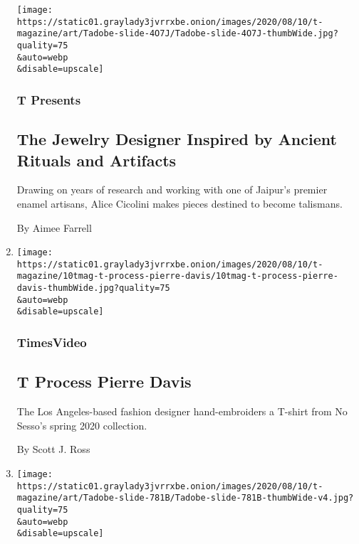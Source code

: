 \begin{enumerate}
  \texttt{[image: https://static01.graylady3jvrrxbe.onion/images/2020/08/10/t-magazine/art/Tadobe-slide-4O7J/Tadobe-slide-4O7J-thumbWide.jpg?quality=75\\\&auto=webp\\\&disable=upscale]}

  \hypertarget{t-presents-6}{%
  \subsubsection{T Presents}\label{t-presents-6}}

  \hypertarget{the-jewelry-designer-inspired-by-ancient-rituals-and-artifacts}{%
  \subsection{The Jewelry Designer Inspired by Ancient Rituals and
  Artifacts}\label{the-jewelry-designer-inspired-by-ancient-rituals-and-artifacts}}

  Drawing on years of research and working with one of Jaipur's premier
  enamel artisans, Alice Cicolini makes pieces destined to become
  talismans.

  By Aimee Farrell
\item
  \href{/video/t-magazine/100000007259335/t-process-pierre-davis.html}{}

  \texttt{[image: https://static01.graylady3jvrrxbe.onion/images/2020/08/10/t-magazine/10tmag-t-process-pierre-davis/10tmag-t-process-pierre-davis-thumbWide.jpg?quality=75\\\&auto=webp\\\&disable=upscale]}

  \hypertarget{timesvideo}{%
  \subsubsection{TimesVideo}\label{timesvideo}}

  \hypertarget{t-process--pierre-davis}{%
  \subsection{T Process \textbar{} Pierre
  Davis}\label{t-process--pierre-davis}}

  The Los Angeles-based fashion designer hand-embroiders a T-shirt from
  No Sesso's spring 2020 collection.

  By Scott J. Ross
\item
  \href{/2020/08/10/t-magazine/jatovia-gary-film.html}{}

  \texttt{[image: https://static01.graylady3jvrrxbe.onion/images/2020/08/10/t-magazine/art/Tadobe-slide-781B/Tadobe-slide-781B-thumbWide-v4.jpg?quality=75\\\&auto=webp\\\&disable=upscale]}


\end{enumerate}
